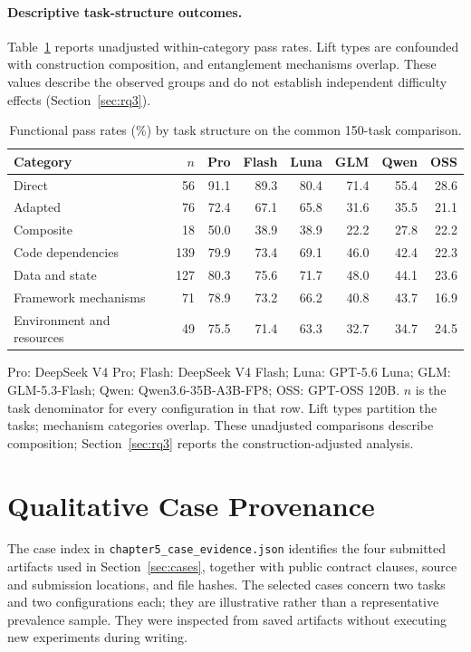 \documentclass[acmsmall,screen,review,anonymous,nonacm]{acmart}
\begin{document}
\paragraph{Descriptive task-structure outcomes.}
Table~\ref{tab:structure} reports unadjusted within-category pass rates.
Lift types are confounded with construction composition, and entanglement
mechanisms overlap. These values describe the observed groups and do not
establish independent difficulty effects (Section~\ref{sec:rq3}).

\begin{table}[tbp]
 \caption{Functional pass rates (\%) by task structure on the common 150-task comparison.}
 \label{tab:structure}
 \centering\small
 \setlength{\tabcolsep}{3pt}
 \begin{tabular}{@{}lrrrrrrr@{}}
 \toprule
 Category & $n$ & Pro & Flash & Luna & GLM & Qwen & OSS \\
 \midrule
 Direct & 56 & 91.1 & 89.3 & 80.4 & 71.4 & 55.4 & 28.6 \\
 Adapted & 76 & 72.4 & 67.1 & 65.8 & 31.6 & 35.5 & 21.1 \\
 Composite & 18 & 50.0 & 38.9 & 38.9 & 22.2 & 27.8 & 22.2 \\
 \midrule
 Code dependencies & 139 & 79.9 & 73.4 & 69.1 & 46.0 & 42.4 & 22.3 \\
 Data and state & 127 & 80.3 & 75.6 & 71.7 & 48.0 & 44.1 & 23.6 \\
 Framework mechanisms & 71 & 78.9 & 73.2 & 66.2 & 40.8 & 43.7 & 16.9 \\
 Environment and resources & 49 & 75.5 & 71.4 & 63.3 & 32.7 & 34.7 & 24.5 \\
 \bottomrule
 \end{tabular}
 \par\smallskip\begin{minipage}{\linewidth}\footnotesize
 Pro: DeepSeek V4 Pro; Flash: DeepSeek V4 Flash; Luna: GPT-5.6 Luna; GLM: GLM-5.3-Flash; Qwen: Qwen3.6-35B-A3B-FP8; OSS: GPT-OSS 120B.
 $n$ is the task denominator for every configuration in that row. Lift types partition the tasks; mechanism categories overlap. These unadjusted comparisons describe composition; Section~\ref{sec:rq3} reports the construction-adjusted analysis.
 \end{minipage}
\end{table}

\section{Qualitative Case Provenance}
\label{app:diagnostic-counts}
The case index in \texttt{chapter5\_case\_evidence.json} identifies the four
submitted artifacts used in Section~\ref{sec:cases}, together with public
contract clauses, source and submission locations, and file hashes.
The selected cases concern two tasks and two configurations each; they are
illustrative rather than a representative prevalence sample. They were
inspected from saved artifacts without executing new experiments during writing.
\end{document}
